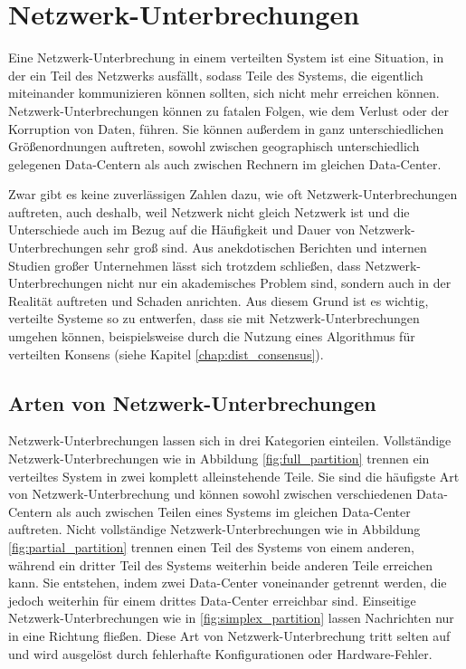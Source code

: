 \documentclass[12pt,a4paper]{report}
\begin{document}
\section{Netzwerk-Unterbrechungen}
Eine Netzwerk-Unterbrechung in einem verteilten System ist eine Situation, in der ein Teil des Netzwerks ausfällt, sodass Teile
des Systems, die eigentlich miteinander kommunizieren können sollten, sich nicht mehr erreichen können. Netzwerk-Unterbrechungen
können zu fatalen Folgen, wie dem Verlust oder der Korruption von Daten, führen. Sie können außerdem in ganz unterschiedlichen
Größenordnungen auftreten, sowohl zwischen geographisch unterschiedlich gelegenen Data-Centern als auch zwischen Rechnern im
gleichen Data-Center. \cite{analysis_of_network_partition_failures}

Zwar gibt es keine zuverlässigen Zahlen dazu, wie oft Netzwerk-Unterbrech\-un\-gen auftreten, auch deshalb, weil Netzwerk nicht gleich
Netzwerk ist und die Unterschiede auch im Bezug auf die Häufigkeit und Dauer von Netzwerk-Unterbrechungen sehr groß sind. Aus
anekdotischen Berichten und internen Studien großer Unternehmen lässt sich trotzdem schließen, dass Netzwerk-Unterbrechungen nicht
nur ein akademisches Problem sind, sondern auch in der Realität auftreten und Schaden anrichten. Aus diesem Grund ist es wichtig,
verteilte Systeme so zu entwerfen, dass sie mit Netzwerk-Unterbrechungen umgehen können, beispielsweise durch die Nutzung eines
Algorithmus für verteilten Konsens (siehe Kapitel \ref{chap:dist_consensus}). \cite{the_network_is_reliable}

\subsection{Arten von Netzwerk-Unterbrechungen}
Netzwerk-Unterbrechungen lassen sich in drei Kategorien einteilen. Vollstän\-dige Netzwerk-Unterbrechungen wie in Abbildung
\ref{fig:full_partition} trennen ein verteiltes System in zwei komplett alleinstehende Teile. Sie sind die häufigste Art von
Netzwerk-Unterbrechung und können sowohl zwischen verschiedenen Data-Centern als auch zwischen Teilen eines Systems im gleichen
Data-Center auftreten. Nicht vollständige Netzwerk-Unterbrechungen wie in Abbildung \ref{fig:partial_partition} trennen einen Teil des
Systems von einem anderen, während ein dritter Teil des Systems weiterhin beide anderen Teile erreichen kann. Sie entstehen, indem
zwei Data-Center voneinander getrennt werden, die jedoch weiterhin für einem drittes Data-Center erreichbar sind. Einseitige
Netzwerk-Unterbrechungen wie in \ref{fig:simplex_partition} lassen Nachrichten nur in eine Richtung fließen. Diese Art von
Netzwerk-Unterbrechung tritt selten auf und wird ausgelöst durch fehlerhafte Konfigurationen oder Hardware-Fehler.
\cite{analysis_of_network_partition_failures}
\end{document}
